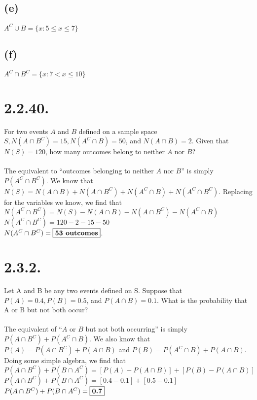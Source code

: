 \documentclass{article}
\begin{document}
{\subsection*{(e)}
\( A^C \cup B = \{ x : 5 \leq x \leq 7 \} \)

\subsection*{(f)}
\( A^C \cap B^C = \{ x : 7 < x \leq 10 \} \)

\section*{2.2.40.} 
For two events \(A\) and \(B\) defined on a sample space \(S, N(A \cap B^C) = 15, N(A^C \cap B) = 50\), and \(N(A \cap B) = 2\). Given that \(N(S) = 120\), how many outcomes belong to neither \(A\) nor \(B\)?\@
\\ \\
The equivalent to ``outcomes belonging to neither \(A\) nor \(B\)'' is simply \( P(A^C \cap B^C) \). We know that \( N(S) = N(A \cap B) + N(A \cap B^C) + N(A^C \cap B) + N(A^C \cap B^C) \). Replacing for the variables we know, we find that \\
\( N(A^C \cap B^C) = N(S) - N(A \cap B) - N(A \cap B^C) - N(A^C \cap B) \) \\
\( N(A^C \cap B^C) = 120 - 2 - 15 - 50 \) \\
\( N(A^C \cap B^C) = \fbox{\textbf{53 outcomes}} \).

\section*{2.3.2.} 
Let A and B be any two events defined on S. Suppose that \(P(A) = 0.4, P(B) = 0.5\), and \(P(A \cap B) = 0.1\). What is the probability that A or B but not both occur?\@
\\ \\ 
The equivalent of ``\(A\) or \(B\) but not both occurring'' is simply \( P(A \cap B^C) + P(A^C \cap B) \). We also know that \( P(A) = P(A \cap B^C) + P(A \cap B) \) and \( P(B) = P(A^C \cap B) + P(A \cap B) \). Doing some simple algebra, we find that \\
\( P (A \cap B^C) + P(B \cap A^C) = [P(A) - P(A \cap B)] + [P(B) - P(A \cap B)] \) \\
\( P (A \cap B^C) + P(B \cap A^C) = [0.4 - 0.1] + [0.5 - 0.1] \) \\
\( P (A \cap B^C) + P(B \cap A^C) =  \fbox{\textbf{0.7}} \)

}
\end{document}
